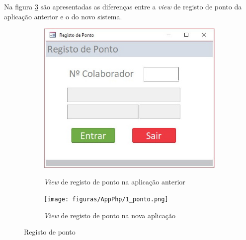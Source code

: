 \newpage
Na figura \ref{fig:comparacao_ponto} são apresentadas as diferenças entre a \textit{view} de registo de ponto da aplicação anterior e o do novo sistema.
\begin{figure}[H]
	\centering
	
	\begin{subfigure}[t]{0.45\linewidth}
		\includegraphics[width=\linewidth]{figuras/AppAccess/1-Ponto.jpg}
		\label{fig:comparacao_ponto_1}
		\caption{\textit{View} de registo de ponto na aplicação anterior}
	\end{subfigure}
	\begin{subfigure}[t]{0.45\linewidth}
		\texttt{[image: figuras/AppPhp/1\_ponto.png]}
		\label{fig:comparacao_ponto_2}
		\caption{\textit{View} de registo de ponto na nova aplicação}
	\end{subfigure}
	
	\caption{Registo de ponto}
	\label{fig:comparacao_ponto}
\end{figure}

